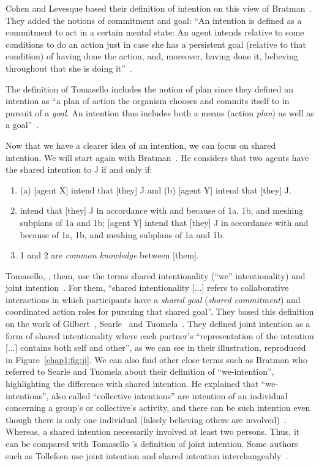 \documentclass[a4paper,11pt,twoside]{StyleThese}
\begin{document}
Cohen and Levesque based their definition of intention on this view of Bratman~\cite{cohen_1990_intention}. They added the notions of commitment and goal: ``An intention is defined as a commitment to act in a certain mental state: An agent intends relative to some conditions to do an action just in case she has a persistent goal (relative to that condition) of having done the action, and, moreover, having done it, believing throughout that she is doing it''~\cite[p.~496]{cohen_1991_teamwork}. 

The definition of Tomasello \etal{} includes the notion of plan since they defined an intention as ``a plan of action the organism chooses and commits itself to in pursuit of a \emph{goal}. An intention thus includes both a means (action \emph{plan}) as well as a goal''~\cite[p.~676]{tomasello_2005_understanding}. 

Now that we have a clearer idea of an intention, we can focus on shared intention. We will start again with Bratman~\cite{bratman_1993_shared}. He considers that two agents have the shared intention to J if and only if: 
\begin{enumerate}
	\item (a) [agent X] intend that [they] J and (b) [agent Y] intend that [they] J.
	\item\relax [agent X] intend that [they] J in accordance with and because of 1a, 1b, and meshing subplans of 1a and 1b; [agent Y] intend that [they] J in accordance with and because of 1a, 1b, and meshing subplans of 1a and 1b.
	\item 1 and 2 are \emph{common knowledge} between [them].
\end{enumerate}

Tomasello, \etal{}, them, use the terms shared intentionality (``we'' intentionality) and joint intention~\cite{tomasello_2005_understanding}. For them, ``shared intentionality [...] refers to collaborative interactions in which participants have a \emph{shared goal} (\emph{shared commitment}) and coordinated action roles for pursuing that shared goal''. They based this definition on the work of Gilbert~\cite{gilbert_1989_social}, Searle~\cite{searle_1983_intentionality} and Tuomela~\cite{tuomela_1995_importance}. They defined joint intention as a form of shared intentionality where each partner's ``representation of the intention [...] contains both self and other'', as we can see in their illustration, reproduced in Figure~\ref{chap1:fig:ji}. We can also find other close terms such as Bratman who referred to Searle and Tuomela about their definition of ``we-intention'', highlighting the difference with shared intention. He explained that ``we-intentions'', also called ``collective intentions'' are intention of an individual concerning a group's or collective's activity, and there can be such intention even though there is only one individual (falsely believing others are involved)~\cite{bratman_1993_shared}. Whereas, a shared intention necessarily involved at least two persons. Thus, it can be compared with Tomasello \etal{}'s definition of joint intention. Some authors such as Tollefsen use joint intention and shared intention interchangeably~\cite{tollefsen_2005_let}.
\end{document}

